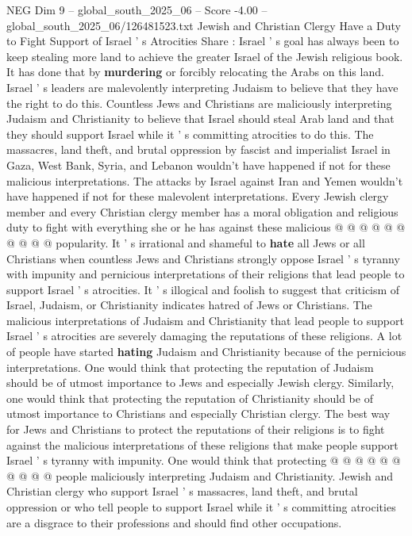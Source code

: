 \begin{textsample}{NEG Dim 9 – global\_south\_2025\_06 – Score -4.00 – global\_south\_2025\_06/126481523.txt}  \label{ex:f9_neg_257}
Jewish and Christian Clergy Have a Duty to Fight Support of Israel ' s Atrocities Share : Israel ' s goal has always been to keep stealing more land to achieve the greater Israel of the Jewish religious book.
It has done that by \textbf{murdering} or forcibly relocating the Arabs on this land.
Israel ' s leaders are malevolently interpreting Judaism to believe that they have the right to do this.
Countless Jews and Christians are maliciously interpreting Judaism and Christianity to believe that Israel should steal Arab land and that they should support Israel while it ' s committing atrocities to do this.
The massacres, land theft, and brutal oppression by fascist and imperialist Israel in Gaza, West Bank, Syria, and Lebanon wouldn't have happened if not for these malicious interpretations.
The attacks by Israel against Iran and Yemen wouldn't have happened if not for these malevolent interpretations.
Every Jewish clergy member and every Christian clergy member has a moral obligation and religious duty to fight with everything she or he has against these malicious @ @ @ @ @ @ @ @ @ @ popularity.
It ' s irrational and shameful to \textbf{hate} all Jews or all Christians when countless Jews and Christians strongly oppose Israel ' s tyranny with impunity and pernicious interpretations of their religions that lead people to support Israel ' s atrocities.
It ' s illogical and foolish to suggest that criticism of Israel, Judaism, or Christianity indicates hatred of Jews or Christians.
The malicious interpretations of Judaism and Christianity that lead people to support Israel ' s atrocities are severely damaging the reputations of these religions.
A lot of people have started \textbf{hating} Judaism and Christianity because of the pernicious interpretations.
One would think that protecting the reputation of Judaism should be of utmost importance to Jews and especially Jewish clergy.
Similarly, one would think that protecting the reputation of Christianity should be of utmost importance to Christians and especially Christian clergy.
The best way for Jews and Christians to protect the reputations of their religions is to fight against the malicious interpretations of these religions that make people support Israel ' s tyranny with impunity.
One would think that protecting @ @ @ @ @ @ @ @ @ @ people maliciously interpreting Judaism and Christianity.
Jewish and Christian clergy who support Israel ' s massacres, land theft, and brutal oppression or who tell people to support Israel while it ' s committing atrocities are a disgrace to their professions and should find other occupations.

\end{textsample}

